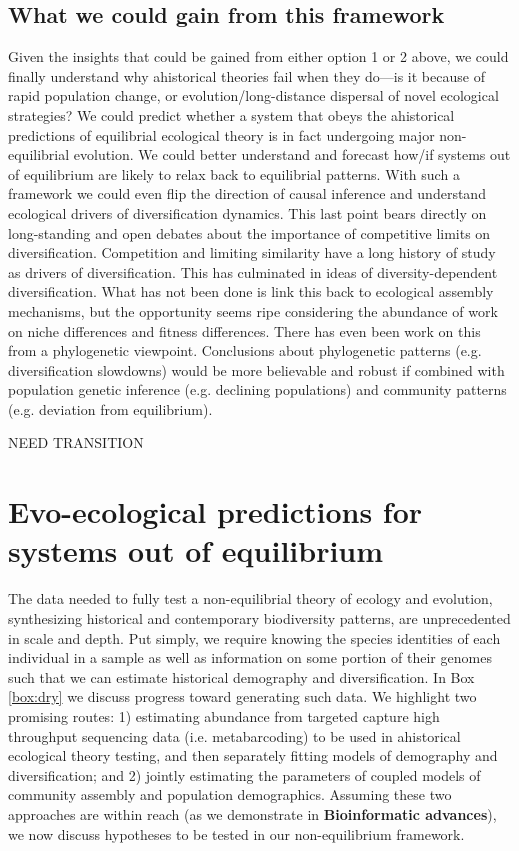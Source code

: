\documentclass[12pt]{article}
\newcounter{Box}
\begin{document}
\subsection{What we could gain from this framework}

Given the insights that could be gained from either option 1 or 2
above, we could finally understand why ahistorical theories fail when
they do---is it because of rapid population change, or
evolution/long-distance dispersal of novel ecological strategies? We
could predict whether a system that obeys the ahistorical predictions
of equilibrial ecological theory is in fact undergoing major
non-equilibrial evolution. We could better understand and forecast
how/if systems out of equilibrium are likely to relax back to
equilibrial patterns. With such a framework we could even flip the
direction of causal inference and understand ecological drivers of
diversification dynamics. This last point bears directly on
long-standing and open debates about the importance of competitive
limits on diversification. Competition and limiting similarity have a
long history of study as drivers of diversification. This has
culminated in ideas of diversity-dependent
diversification\cite{Etienne2012-ky, Rabosky2013-gk, Rabosky2008-bs}.
What has not been done is link this back to ecological assembly
mechanisms, but the opportunity seems ripe considering the abundance
of work on niche differences and fitness
differences\cite{Chesson2000-uc, Adler2007-pl, HilleRisLambers2012-xt,
  Levine2009-qj}.  There has even been work on this from a
phylogenetic viewpoint\cite{Mayfield2010-hg, Godoy2014-iv}.
Conclusions about phylogenetic patterns (e.g. diversification
slowdowns) would be more believable and robust if combined with
population genetic inference (e.g. declining populations) and
community patterns (e.g.  deviation from equilibrium).

NEED TRANSITION

\section{Evo-ecological predictions for systems out of equilibrium}

The data needed to fully test a non-equilibrial theory of ecology and
evolution, synthesizing historical and contemporary biodiversity
patterns, are unprecedented in scale and depth. Put simply, we require
knowing the species identities of each individual in a sample as well
as information on some portion of their genomes such that we can
estimate historical demography and diversification. In Box
\ref{box:dry} we discuss progress toward generating such data. We
highlight two promising routes: 1) estimating abundance from targeted
capture high throughput sequencing data (i.e.  metabarcoding) to be
used in ahistorical ecological theory testing, and then separately
fitting models of demography and diversification; and 2) jointly
estimating the parameters of coupled models of community assembly and
population demographics. Assuming these two approaches are within
reach (as we demonstrate in \textbf{Bioinformatic advances}), we now
discuss hypotheses to be tested in our non-equilibrium framework.
\end{document}
